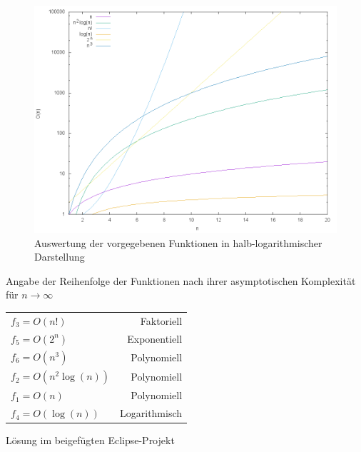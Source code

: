 \documentclass[12pt]{scrartcl}
\begin{document}

\exercise{}
\begin{figure}[h]
\begin{center}
\includegraphics[scale=0.5]{complexity.png}
\caption{Auswertung der vorgegebenen Funktionen in halb-logarithmischer Darstellung}
\end{center}
\end{figure}
Angabe der Reihenfolge der Funktionen nach ihrer asymptotischen Komplexität für $n \rightarrow \infty $\\
\begin{center}
\begin{tabular}{l r}
$f_3=O(n!)$ & Faktoriell\\
$f_5=O(2^n)$ & Exponentiell\\
$f_6=O(n^3)$ & Polynomiell\\
$f_2=O(n^2 \log(n))$ & Polynomiell\\
$f_1=O(n)$ & Polynomiell\\
$f_4=O(\log(n))$ & Logarithmisch\\
\end{tabular}
\end{center}


\exercise{}
Lösung im beigefügten Eclipse-Projekt
\newpage
\end{document}
